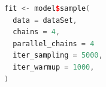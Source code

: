 \begin{lstlisting}[language=C++,label={code:PRE_04cmd},caption={cmdstanrのスタイル}]
fit <- model$sample(
  data = dataSet,
  chains = 4,
  parallel_chains = 4
  iter_sampling = 5000,
  iter_warmup = 1000,
)
\end{lstlisting}
